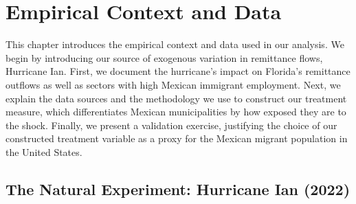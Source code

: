 \chapter{Empirical Context and Data} \label{chap:data_empirics}

This chapter introduces the empirical context and data used in our analysis. We begin by introducing our source of exogenous variation in remittance flows, Hurricane Ian. First, we document the hurricane's impact on Florida's remittance outflows as well as sectors with high Mexican immigrant employment. Next, we explain the data sources and the methodology we use to construct our treatment measure, which differentiates Mexican municipalities by how exposed they are to the shock. Finally, we present a validation exercise, justifying the choice of our constructed treatment variable as a proxy for the Mexican migrant population in the United States.

\section{The Natural Experiment: Hurricane Ian (2022)}

